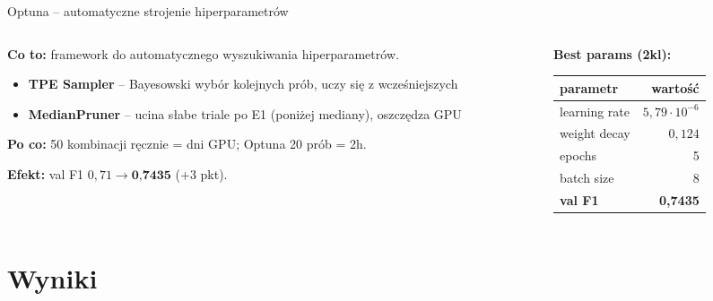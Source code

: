 \documentclass[10pt]{beamer}
\begin{document}
\begin{frame}{Optuna -- automatyczne strojenie hiperparametrów}
  \begin{columns}[T]
    \begin{column}{0.55\textwidth}
      \small
      \textbf{Co to:} framework do automatycznego wyszukiwania
      hiperparametrów.

      \begin{itemize}
        \item \textbf{TPE Sampler} -- Bayesowski wybór kolejnych prób,
              uczy się z wcześniejszych
        \item \textbf{MedianPruner} -- ucina słabe triale po E1
              (poniżej mediany), oszczędza GPU
      \end{itemize}

      \textbf{Po co:} 50 kombinacji ręcznie = dni GPU; Optuna 20 prób = 2h.

      \textbf{Efekt:} val F1 $0{,}71 \to \textbf{0{,}7435}$ (+3 pkt).
    \end{column}
    \begin{column}{0.45\textwidth}
      \small
      \centering
      \textbf{Best params (2kl):}
      \vspace{0.3em}
      \begin{tabular}{lr}
        \toprule
        parametr & wartość \\
        \midrule
        learning rate & $5{,}79 \cdot 10^{-6}$ \\
        weight decay  & $0{,}124$ \\
        epochs        & 5 \\
        batch size    & 8 \\
        \midrule
        \textbf{val F1} & \textbf{0{,}7435} \\
        \bottomrule
      \end{tabular}
    \end{column}
  \end{columns}
\end{frame}

\section{Wyniki}
\end{document}
